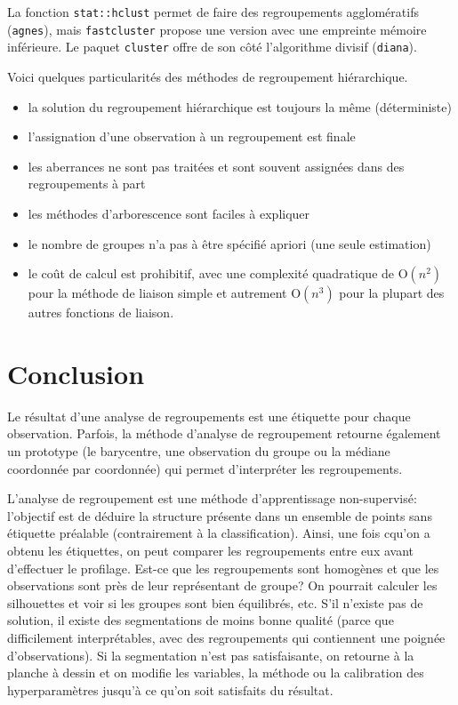 \documentclass[
  11pt,
  letterpaper,
]{scrbook}
\providecommand{\tightlist}{%
  \setlength{\itemsep}{0pt}\setlength{\parskip}{0pt}}\usepackage{longtable,booktabs,array}
\theoremstyle{definition}
\theoremstyle{remark}
\begin{document}
La fonction \texttt{stat::hclust} permet de faire des regroupements
agglomératifs (\texttt{agnes}), mais \texttt{fastcluster} propose une
version avec une empreinte mémoire inférieure. Le paquet
\texttt{cluster} offre de son côté l'algorithme divisif
(\texttt{diana}).

Voici quelques particularités des méthodes de regroupement hiérarchique.

\begin{itemize}
\tightlist
\item
  la solution du regroupement hiérarchique est toujours la même
  (déterministe)
\item
  l'assignation d'une observation à un regroupement est finale
\item
  les aberrances ne sont pas traitées et sont souvent assignées dans des
  regroupements à part
\item
  les méthodes d'arborescence sont faciles à expliquer
\item
  le nombre de groupes n'a pas à être spécifié apriori (une seule
  estimation)
\item
  le coût de calcul est prohibitif, avec une complexité quadratique de
  \(\mathrm{O}(n^2)\) pour la méthode de liaison simple et autrement
  \(\mathrm{O}(n^3)\) pour la plupart des autres fonctions de liaison.
\end{itemize}

\hypertarget{conclusion}{%
\section{Conclusion}\label{conclusion}}

Le résultat d'une analyse de regroupements est une étiquette pour chaque
observation. Parfois, la méthode d'analyse de regroupement retourne
également un prototype (le barycentre, une observation du groupe ou la
médiane coordonnée par coordonnée) qui permet d'interpréter les
regroupements.

L'analyse de regroupement est une méthode d'apprentissage non-supervisé:
l'objectif est de déduire la structure présente dans un ensemble de
points sans étiquette préalable (contrairement à la classification).
Ainsi, une fois cqu'on a obtenu les étiquettes, on peut comparer les
regroupements entre eux avant d'effectuer le profilage. Est-ce que les
regroupements sont homogènes et que les observations sont près de leur
représentant de groupe? On pourrait calculer les silhouettes et voir si
les groupes sont bien équilibrés, etc. S'il n'existe pas de solution, il
existe des segmentations de moins bonne qualité (parce que difficilement
interprétables, avec des regroupements qui contiennent une poignée
d'observations). Si la segmentation n'est pas satisfaisante, on retourne
à la planche à dessin et on modifie les variables, la méthode ou la
calibration des hyperparamètres jusqu'à ce qu'on soit satisfaits du
résultat.
\end{document}
